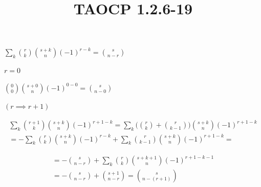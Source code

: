 \documentclass{article}
\title{TAOCP 1.2.6\mbox{-}19}
\begin{document}
\maketitle

\( \sum_{k} \binom{r}{k}\binom{s+k}{n}{(-1)}^{r-k} = \binom{s}{n - r} \)

\( r = 0 \)

\( \binom{0}{0}\binom{s+0}{n}{(-1)}^{0-0} = \binom{s}{n-0} \)

\( (r \implies r + 1) \)

\begin{multline*}
\sum_{k} \binom{r+1}{k}\binom{s+k}{n}{(-1)}^{r+1-k} = \sum_{k} \bigl(\binom{r}{k} + \binom{r}{k-1}\bigr)\binom{s+k}{n}{(-1)}^{r+1-k} \\
= -\sum_{k} \binom{r}{k}\binom{s+k}{n}{(-1)}^{r-k} + \sum_{k} \binom{r}{k-1}\binom{s+k}{n}{(-1)}^{r+1-k} =
\end{multline*}

\begin{multline*}
= -\binom{s}{n - r} + \sum_{k} \binom{r}{k}\binom{s+k+1}{n}{(-1)}^{r+1-k-1} \\
= -\binom{s}{n - r} + \binom{s+1}{n - r} = \binom{s}{n - (r+1)}
\end{multline*}
\end{document}
